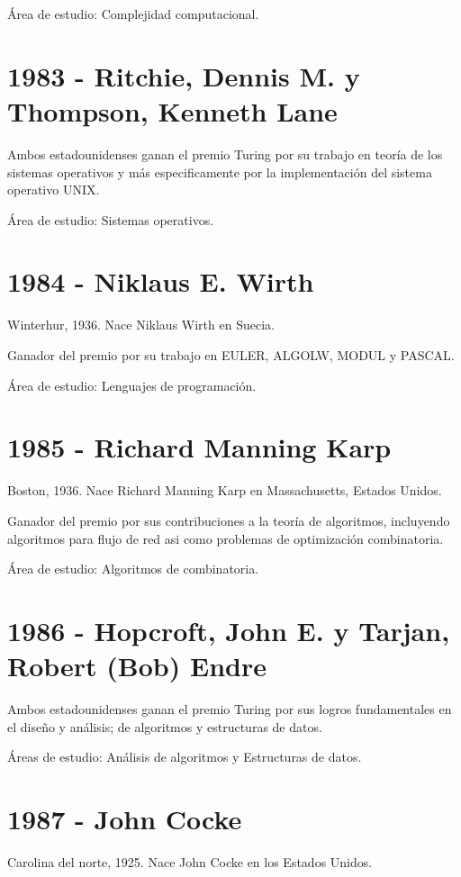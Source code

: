 \documentclass[notitlepage,letterpaper, 11pt]{article}
\begin{document}
\noindent Área de estudio: Complejidad computacional.
\newline

\section*{1983 - Ritchie, Dennis M. y Thompson, Kenneth Lane}
\noindent Ambos estadounidenses ganan el premio Turing por su trabajo en teoría de los sistemas operativos y más especificamente por la implementación del sistema operativo UNIX.

\noindent Área de estudio: Sistemas operativos.
\newline

\section*{1984 - Niklaus E. Wirth}
\noindent Winterhur, 1936. Nace Niklaus Wirth en Suecia.

\noindent Ganador del premio por su trabajo en EULER, ALGOLW, MODUL y PASCAL.

\noindent Área de estudio: Lenguajes de programación.
\newline

\section*{1985 - Richard Manning Karp}
\noindent Boston, 1936. Nace Richard Manning Karp en Massachusetts, Estados Unidos.

\noindent Ganador del premio por sus contribuciones a la teoría de algoritmos, incluyendo algoritmos para flujo de red asi como problemas de optimización combinatoria.

\noindent Área de estudio: Algoritmos de combinatoria.
\newline

\section*{1986 - Hopcroft, John E. y Tarjan, Robert (Bob) Endre}
\noindent Ambos estadounidenses ganan el premio Turing por sus logros fundamentales en el diseño y análisis; de algoritmos y estructuras de datos.

\noindent Áreas de estudio: Análisis de algoritmos y Estructuras de datos.
\newpage

\section*{1987 - John Cocke}
\noindent Carolina del norte, 1925. Nace John Cocke en los Estados Unidos.
\end{document}
